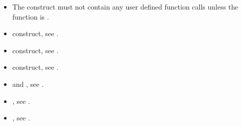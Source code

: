 \begin{fortranspecific}
\begin{samepage}
\begin{itemize}
\item The construct must not contain any user defined function calls unless the function is
.
\end{itemize}
\end{samepage}

\crossreferences
\begin{itemize}

\item {} construct, see .

\item {} construct, see .

\item {} construct, see .

\item {} and , see
  .
\item {}, see .
\item {}, see
.
\end{itemize}

\end{fortranspecific}
